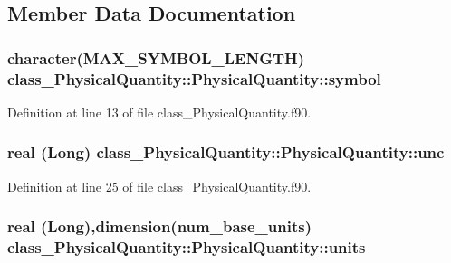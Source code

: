 \subsection{Member Data Documentation}
\hypertarget{typeclass__PhysicalQuantity_1_1PhysicalQuantity_a2f981d73988825d1960abd97a8abfb8f}{
\subsubsection[{symbol}]{\setlength{\rightskip}{0pt plus 5cm}character({\bf MAX\_\-SYMBOL\_\-LENGTH}) {\bf class\_\-PhysicalQuantity::PhysicalQuantity::symbol}}}
\label{typeclass__PhysicalQuantity_1_1PhysicalQuantity_a2f981d73988825d1960abd97a8abfb8f}


Definition at line 13 of file class\_\-PhysicalQuantity.f90.

\hypertarget{typeclass__PhysicalQuantity_1_1PhysicalQuantity_abb0c17659fe335d551d4e715b84e9743}{
\subsubsection[{unc}]{\setlength{\rightskip}{0pt plus 5cm}real (Long) {\bf class\_\-PhysicalQuantity::PhysicalQuantity::unc}}}
\label{typeclass__PhysicalQuantity_1_1PhysicalQuantity_abb0c17659fe335d551d4e715b84e9743}


Definition at line 25 of file class\_\-PhysicalQuantity.f90.

\hypertarget{typeclass__PhysicalQuantity_1_1PhysicalQuantity_a3d431173fc79af5743037ff1f68237d3}{
\subsubsection[{units}]{\setlength{\rightskip}{0pt plus 5cm}real (Long),dimension(num\_\-base\_\-units) {\bf class\_\-PhysicalQuantity::PhysicalQuantity::units}}}
\label{typeclass__PhysicalQuantity_1_1PhysicalQuantity_a3d431173fc79af5743037ff1f68237d3}


